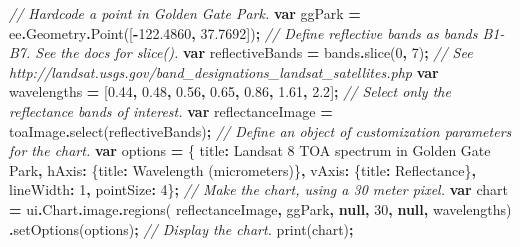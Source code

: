 \documentclass[
]{article}
\newenvironment{Shaded}{\begin{snugshade}}{\end{snugshade}}
\newcommand{\AttributeTok}[1]{\textcolor[rgb]{0.77,0.63,0.00}{#1}}
\newcommand{\CommentTok}[1]{\textcolor[rgb]{0.56,0.35,0.01}{\textit{#1}}}
\newcommand{\DataTypeTok}[1]{\textcolor[rgb]{0.13,0.29,0.53}{#1}}
\newcommand{\DecValTok}[1]{\textcolor[rgb]{0.00,0.00,0.81}{#1}}
\newcommand{\FloatTok}[1]{\textcolor[rgb]{0.00,0.00,0.81}{#1}}
\newcommand{\FunctionTok}[1]{\textcolor[rgb]{0.00,0.00,0.00}{#1}}
\newcommand{\KeywordTok}[1]{\textcolor[rgb]{0.13,0.29,0.53}{\textbf{#1}}}
\newcommand{\NormalTok}[1]{#1}
\newcommand{\OperatorTok}[1]{\textcolor[rgb]{0.81,0.36,0.00}{\textbf{#1}}}
\newcommand{\StringTok}[1]{\textcolor[rgb]{0.31,0.60,0.02}{#1}}
\begin{document}
\begin{enumerate}
\begin{Shaded}
\begin{Highlighting}[]
\CommentTok{//  Hardcode a point in Golden Gate Park.   }
\KeywordTok{var}\NormalTok{ ggPark }\OperatorTok{=}\NormalTok{ ee}\OperatorTok{.}\AttributeTok{Geometry}\OperatorTok{.}\FunctionTok{Point}\NormalTok{([}\OperatorTok{{-}}\FloatTok{122.4860}\OperatorTok{,} \FloatTok{37.7692}\NormalTok{])}\OperatorTok{;}      
\CommentTok{// Define reflective  bands as bands B1{-}B7. See the docs for slice().   }
\KeywordTok{var}\NormalTok{ reflectiveBands }\OperatorTok{=}\NormalTok{ bands}\OperatorTok{.}\FunctionTok{slice}\NormalTok{(}\DecValTok{0}\OperatorTok{,} \DecValTok{7}\NormalTok{)}\OperatorTok{;}      
\CommentTok{// See  http://landsat.usgs.gov/band\_designations\_landsat\_satellites.php   }
\KeywordTok{var}\NormalTok{ wavelengths }\OperatorTok{=}\NormalTok{ [}\FloatTok{0.44}\OperatorTok{,} \FloatTok{0.48}\OperatorTok{,} \FloatTok{0.56}\OperatorTok{,} \FloatTok{0.65}\OperatorTok{,} \FloatTok{0.86}\OperatorTok{,} \FloatTok{1.61}\OperatorTok{,} \FloatTok{2.2}\NormalTok{]}\OperatorTok{;}      
\CommentTok{// Select only the  reflectance bands of interest.   }
\KeywordTok{var}\NormalTok{ reflectanceImage }\OperatorTok{=}\NormalTok{  toaImage}\OperatorTok{.}\FunctionTok{select}\NormalTok{(reflectiveBands)}\OperatorTok{;}      
\CommentTok{// Define an object of  customization parameters for the chart.   }
\KeywordTok{var}\NormalTok{ options }\OperatorTok{=}\NormalTok{ \{}
  \DataTypeTok{title}\OperatorTok{:} \StringTok{\textquotesingle{}Landsat  8 TOA spectrum in Golden Gate Park\textquotesingle{}}\OperatorTok{,}    
               \DataTypeTok{hAxis}\OperatorTok{:}\NormalTok{ \{}\DataTypeTok{title}\OperatorTok{:} \StringTok{\textquotesingle{}Wavelength  (micrometers)\textquotesingle{}}\NormalTok{\}}\OperatorTok{,}
               \DataTypeTok{vAxis}\OperatorTok{:}\NormalTok{ \{}\DataTypeTok{title}\OperatorTok{:} \StringTok{\textquotesingle{}Reflectance\textquotesingle{}}\NormalTok{\}}\OperatorTok{,}
               \DataTypeTok{lineWidth}\OperatorTok{:} \DecValTok{1}\OperatorTok{,}
               \DataTypeTok{pointSize}\OperatorTok{:} \DecValTok{4}\NormalTok{\}}\OperatorTok{;}      
\CommentTok{// Make the chart, using  a 30 meter pixel.   }
\KeywordTok{var}\NormalTok{ chart }\OperatorTok{=}\NormalTok{ ui}\OperatorTok{.}\AttributeTok{Chart}\OperatorTok{.}\AttributeTok{image}\OperatorTok{.}\FunctionTok{regions}\NormalTok{(}
\NormalTok{  reflectanceImage}\OperatorTok{,} 
\NormalTok{  ggPark}\OperatorTok{,} \KeywordTok{null}\OperatorTok{,} \DecValTok{30}\OperatorTok{,} \KeywordTok{null}\OperatorTok{,}\NormalTok{ wavelengths)}
        \OperatorTok{.}\FunctionTok{setOptions}\NormalTok{(options)}\OperatorTok{;}      
\CommentTok{// Display the chart.   }
\FunctionTok{print}\NormalTok{(chart)}\OperatorTok{;}  
\end{Highlighting}
\end{Shaded}
\end{enumerate}
\end{document}
